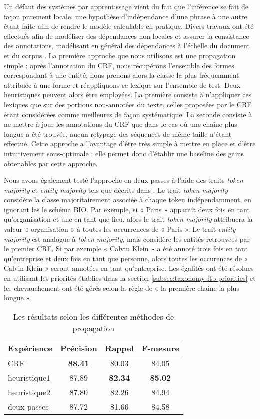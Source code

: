 \documentclass[citation\_needed]{subfiles}
\begin{document}
Un défaut des systèmes par apprentissage vient du fait que l'inférence se fait de façon purement locale, une hypothèse d'indépendance d'une phrase à une autre étant faite afin de rendre le modèle calculable en pratique. Divers travaux ont été effectués afin de modéliser des dépendances non-locales et assurer la consistance des annotations, modélisant en général des dépendances à l'échelle du document et du corpus \citep{krishnan2006effective,ratinov2009design}. La première approche que nous utilisons est une propagation simple : après l'annotation du CRF, nous récupérons l'ensemble des formes correspondant à une entité, nous prenons alors la classe la plus fréquemment attribuée à une forme et réappliquons ce lexique sur l'ensemble de test. Deux heuristiques peuvent alors être employées. La première consiste à n'appliquer ces lexiques que sur des portions non-annotées du texte, celles proposées par le CRF étant considérées comme meilleures de façon systématique. La seconde consiste à ne mettre à jour les annotations du CRF que dans le cas où une chaîne plus longue a été trouvée, aucun retypage des séquences de même taille n'étant effectué. Cette approche a l'avantage d'être très simple à mettre en place et d'être intuitivement sous-optimale : elle permet donc d'établir une baseline des gains obtenables par cette approche.

Nous avons également testé l'approche en deux passes à l'aide des traits \emph{token majority} et \emph{entity majority} tels que décrits dans \citet{krishnan2006effective,mao2007using,ratinov2009design}. Le trait \textit{token majority} considère la classe majoritairement associée à chaque token indépendamment, en ignorant les le schéma BIO. Par exemple, si « Paris » apparaît deux fois en tant qu'organisation et une en tant que lieu, alors le trait \textit{token majority} attribuera la valeur « organisation » à toutes les occurrences de « Paris ». Le trait \textit{entity majority} est analogue à \textit{token majority}, mais considère les entités retrouvées par le premier CRF. Si par exemple « Calvin Klein » a été annoté trois fois en tant qu'entreprise et deux fois en tant que personne, alors toutes les occurences de « Calvin Klein » seront annotées en tant qu'entreprise. Les égalités ont été résolues en utilisant les priorités établies dans la section \ref{subsec:taxonomy-ftb-priorities} et les chevauchement ont été gérés selon la règle de « la première chaine la plus longue ».

\begin{table}[ht!]
\centering
\begin{tabular}{|l|ccc|}
\hline
Expérience   & Précision & Rappel & F-mesure \\
\hline
CRF          & \textbf{88.41} & 80.03 & 84.05 \\
heuristique1 & 87.89 & \textbf{82.34} & \textbf{85.02} \\
heuristique2 & 87.80 & 82.26 & 84.94 \\
deux passes  & 87.72 & 81.66 & 84.58 \\
\hline
\end{tabular}
\caption{Les résultats selon les différentes méthodes de propagation}
\label{tab:CRF-propagation}
\end{table}
\end{document}
